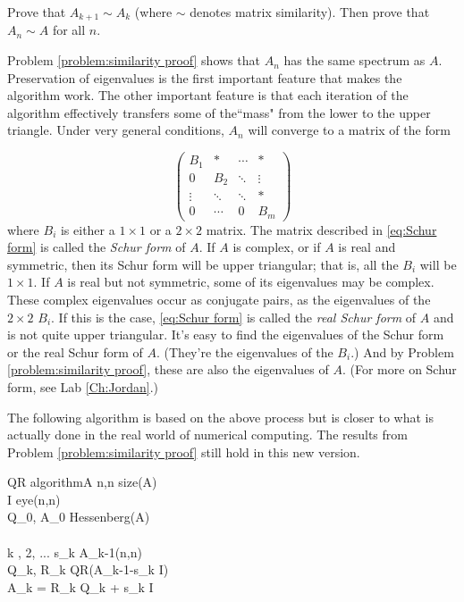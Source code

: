 \begin{problem}
\label{problem:similarity proof}
Prove that $A_{k+1} \sim A_k$ (where $\sim$ denotes matrix similarity). Then prove that $A_n \sim A$ for all $n$.  
\end{problem}

Problem \ref{problem:similarity proof} shows that $A_n$ has the same spectrum as $A$. Preservation of eigenvalues is the first important feature that makes the algorithm work. The other important feature is that each iteration of the algorithm effectively transfers some of the``mass" from the lower to the upper triangle. Under very general conditions, $A_n$ will converge to a matrix of the form

\begin{equation}
\label{eq:Schur form}
     \begin{pmatrix}
          B_1 &* & \cdots & * \\
           0     &B_2  &  \ddots & \vdots \\
           \vdots  & \ddots & \ddots & *  \\
           0 & \cdots & 0 & B_m
    \end{pmatrix}
\end{equation}
where $B_i$ is either a $1 \times 1$ or a $2 \times 2$ matrix. The matrix described in \eqref{eq:Schur form} is called the \emph{Schur form} of $A$. If $A$ is complex, or if $A$ is real and symmetric, then its Schur form will be upper triangular; that is, all the $B_i$ will be $1 \times 1$. If $A$ is real but not symmetric, some of its eigenvalues may be complex. These complex eigenvalues occur as conjugate pairs, as the eigenvalues of the $2 \times 2$ $B_i$. If this is the case, \eqref{eq:Schur form} is called the \emph{real Schur form} of $A$ and is not quite upper triangular. It's easy to find the eigenvalues of the Schur form or the real Schur form of $A$. (They're the eigenvalues of the $B_i$.) And by Problem \ref{problem:similarity proof}, these are also the eigenvalues of $A$.
(For more on Schur form, see Lab \ref{Ch:Jordan}.)

The following algorithm is based on the above process but is closer to what is actually done in the real world of numerical computing. The results from Problem \ref{problem:similarity proof} still hold in this new version.

\begin{pseudo}{QR algorithm}{A}
\label{Alg:QR algorithm}
n,n \GETS size(A)\\
I \GETS eye(n,n)\\
 Q_0, A_0 \GETS Hessenberg(A)\\
\\
\FOR k , 2, ... \DO
\BEGIN
	s_k \GETS A_{k-1}(n,n)\\
	Q_k, R_k \GETS QR(A_{k-1}-s_k I)\\
	A_k = R_k Q_k + s_k I
\END
\end{pseudo}

